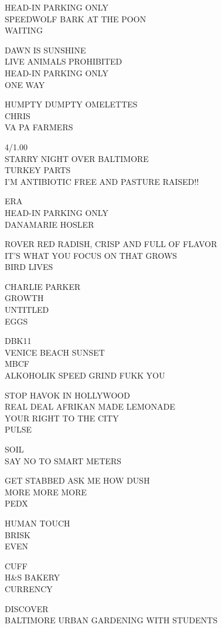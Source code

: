 \documentclass[10pt,letterpaper]{article}
\begin{document}
HEAD{-}IN PARKING ONLY\\
SPEEDWOLF BARK AT THE POON\\
WAITING

DAWN IS SUNSHINE\\
LIVE ANIMALS PROHIBITED\\
HEAD{-}IN PARKING ONLY\\
ONE WAY

HUMPTY DUMPTY OMELETTES\\
CHRIS\\
VA PA FARMERS

4/1.00\\
STARRY NIGHT OVER BALTIMORE\\
TURKEY PARTS\\
I'M ANTIBIOTIC FREE AND PASTURE RAISED!!

ERA\\
HEAD{-}IN PARKING ONLY\\
DANAMARIE HOSLER

ROVER RED RADISH, CRISP AND FULL OF FLAVOR\\
IT'S WHAT YOU FOCUS ON THAT GROWS\\
BIRD LIVES

CHARLIE PARKER\\
GROWTH\\
UNTITLED\\
EGGS

DBK11\\
VENICE BEACH SUNSET\\
MBCF\\
ALKOHOLIK SPEED GRIND FUKK YOU

STOP HAVOK IN HOLLYWOOD\\
REAL DEAL AFRIKAN MADE LEMONADE\\
YOUR RIGHT TO THE CITY\\
PULSE

SOIL\\
SAY NO TO SMART METERS

GET STABBED ASK ME HOW DUSH\\
MORE MORE MORE\\
PEDX

HUMAN TOUCH\\
BRISK\\
EVEN

CUFF\\
H\&S BAKERY\\
CURRENCY

DISCOVER\\
BALTIMORE URBAN GARDENING WITH STUDENTS
\end{document}
